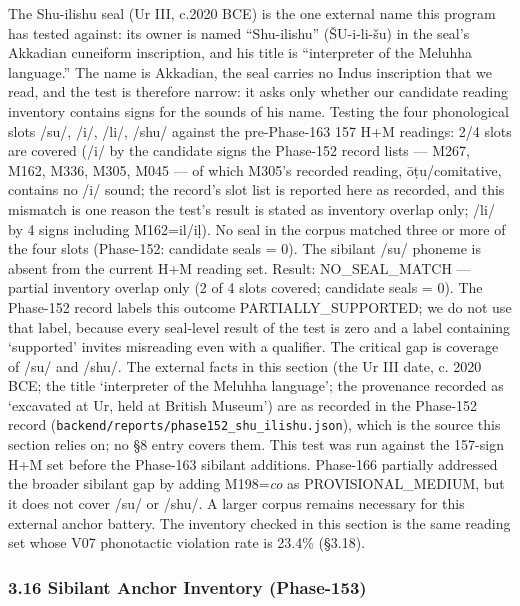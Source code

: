 \documentclass[
]{article}
\begin{document}
The Shu-ilishu seal (Ur III, c.2020 BCE) is the one external name this program has tested against: its owner is named ``Shu-ilishu'' (ŠU-i-li-šu) in the seal's Akkadian cuneiform inscription, and his title is ``interpreter of the Meluhha language.'' The name is Akkadian, the seal carries no Indus inscription that we read, and the test is therefore narrow: it asks only whether our candidate reading inventory contains signs for the sounds of his name. Testing the four phonological slots /su/, /i/, /li/, /shu/ against the pre-Phase-163 157 H+M readings: 2/4 slots are covered (/i/ by the candidate signs the Phase-152 record lists --- M267, M162, M336, M305, M045 --- of which M305's recorded reading, ōṭu/comitative, contains no /i/ sound; the record's slot list is reported here as recorded, and this mismatch is one reason the test's result is stated as inventory overlap only; /li/ by 4 signs including M162=il/iḷ). No seal in the corpus matched three or more of the four slots (Phase-152: candidate seals = 0). The sibilant /su/ phoneme is absent from the current H+M reading set. Result: NO\_SEAL\_MATCH --- partial inventory overlap only (2 of 4 slots covered; candidate seals = 0). The Phase-152 record labels this outcome PARTIALLY\_SUPPORTED; we do not use that label, because every seal-level result of the test is zero and a label containing `supported' invites misreading even with a qualifier. The critical gap is coverage of /su/ and /shu/. The external facts in this section (the Ur III date, c. 2020 BCE; the title `interpreter of the Meluhha language'; the provenance recorded as `excavated at Ur, held at British Museum') are as recorded in the Phase-152 record (\texttt{backend/reports/phase152\_shu\_ilishu.json}), which is the source this section relies on; no §8 entry covers them. This test was run against the 157-sign H+M set before the Phase-163 sibilant additions. Phase-166 partially addressed the broader sibilant gap by adding M198=\emph{co} as PROVISIONAL\_MEDIUM, but it does not cover /su/ or /shu/. A larger corpus remains necessary for this external anchor battery. The inventory checked in this section is the same reading set whose V07 phonotactic violation rate is 23.4\% (§3.18).

\subsubsection{3.16 Sibilant Anchor Inventory
(Phase-153)}\label{sibilant-anchor-inventory-phase-153}
\end{document}
